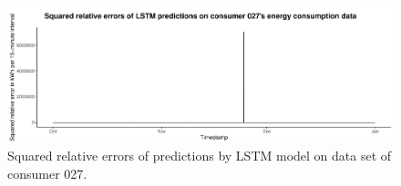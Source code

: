 \begin{centering}
\begin{figure}[H]
    \includegraphics[width=\textwidth]{thesis/graphs/evaluation/c027_squarederrors.pdf}
    \caption[Squared relative errors of predictions by LSTM model on consumer 027]{Squared relative errors of predictions by LSTM model on data set of consumer 027. \quantnet\href{ }{}}
\end{figure}
\end{centering}


